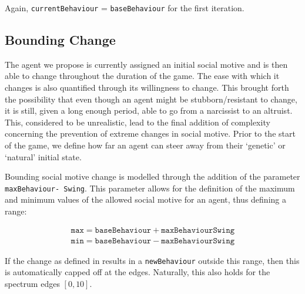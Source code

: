 Again, \texttt{currentBehaviour} = \texttt{baseBehaviour} for the first iteration.

\subsection{Bounding Change}
The agent we propose is currently assigned an initial social motive and is then able to change throughout the duration of the game. The ease with which it changes is also quantified through its willingness to change. This brought forth the possibility that even though an agent might be stubborn/resistant to change, it is still, given a long enough period, able to go from a narcissist to an altruist. This, considered to be unrealistic, lead to the final addition of complexity concerning the prevention of extreme changes in social motive. Prior to the start of the game, we define how far an agent can steer away from their `genetic' or `natural' initial state.

Bounding social motive change is modelled through the addition of the parameter \texttt{maxBehaviour- Swing}. This parameter allows for the definition of the maximum and minimum values of the allowed social motive for an agent, thus defining a range:

\vspace{0.2cm}
\begin{equation}
    \begin{gathered}
    \texttt{max} = \texttt{baseBehaviour} + \texttt{maxBehaviourSwing}  \\
    \texttt{min} = \texttt{baseBehaviour} - \texttt{maxBehaviourSwing}
    \end{gathered}
\end{equation}
\vspace{0.2cm}

If the change as defined in  results in a \texttt{newBehaviour} outside this range, then this is automatically capped off at the edges. Naturally, this also holds for the spectrum edges $[0,10]$.




